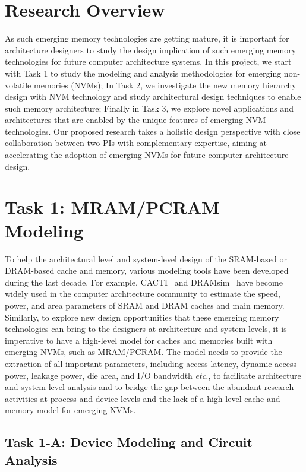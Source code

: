 \section{Research Overview}
As such emerging memory technologies are getting mature, it is important for architecture
designers to study the design implication of such emerging memory technologies for future computer architecture systems. In this project, we start with Task 1 to study the modeling and analysis methodologies for emerging non-volatile memories (NVMs); In Task 2, we investigate the new memory hierarchy design with NVM technology and study architectural design techniques to enable such memory architecture; Finally in Task 3, we explore  novel applications and architectures that are enabled by the unique features of emerging NVM technologies. Our proposed research takes a holistic design perspective with close
collaboration between two PIs with complementary expertise, aiming at
accelerating the adoption of emerging NVMs for
future computer architecture design.

\section{Task 1: MRAM/PCRAM Modeling}

To help the architectural level and system-level design of
the SRAM-based or DRAM-based cache and memory, various
modeling tools have been developed during the last decade. For
example,
CACTI~\cite{CACTI:NORM,PRAM:EVANS,PRAM:eCACTI,PRAM:CACTI60} and
DRAMsim~\cite{DRAMsim} have become widely used in the
computer architecture community to estimate the speed, power, and
area parameters of SRAM and DRAM caches and main memory.
Similarly, to explore new design opportunities that these emerging
memory technologies can bring to the designers at architecture and
system levels, it is imperative to have a high-level model
for caches and memories built with emerging NVMs, such as MRAM/PCRAM.
The model needs to provide the extraction of all important parameters, including access latency,
dynamic access power, leakage power, die area, and I/O bandwidth \emph{etc.},
to facilitate architecture and system-level analysis and to bridge the gap between the
abundant research activities at process and device levels and the lack of a
high-level cache and memory model for emerging NVMs.

\subsection{Task 1-A: Device Modeling and Circuit Analysis}

